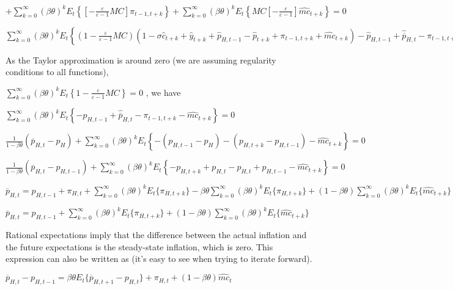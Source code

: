 \documentclass[
]{article}
\begin{document}
\(\displaystyle + \sum_{k=0}^\infty (\beta \theta)^kE_t \left\{ \left[ -\frac{\varepsilon}{\varepsilon-1} MC \right]\pi_{t-1,t+k} \right\} + \sum_{k=0}^\infty (\beta \theta)^kE_t \left\{ MC \left[ -\frac{\varepsilon}{\varepsilon-1} \right]\widehat{mc}_{t+k} \right\}=0\)

\(\displaystyle \sum_{k=0}^\infty (\beta \theta)^kE_t \left\{ \left(1-\frac{\varepsilon}{\varepsilon-1} MC \right)(1-\sigma \hat{c}_{t+k} + \hat{y}_{t+k} + \hat{p}_{H,t-1} -\hat{p}_{t+k} + \pi_{t-1,t+k} + \widehat{mc}_{t+k}) -\hat{p}_{H,t-1} +\hat{\overline{p}}_{H,t}-\pi_{t-1,t+k} - \widehat{mc}_{t+k} \right\}\)

As the Taylor approximation is around zero (we are assuming regularity
conditions to all functions),

\(\displaystyle \sum_{k=0}^\infty (\beta \theta)^kE_t \left\{ 1-\frac{\varepsilon}{\varepsilon-1} MC \right\}=0\)
, we have

\(\displaystyle \sum_{k=0}^\infty (\beta \theta)^kE_t \left\{ -\hat{p}_{H,t-1} +\hat{\overline{p}}_{H,t}-\pi_{t-1,t+k} - \widehat{mc}_{t+k} \right\}=0\)

\(\displaystyle \frac{1}{1-\beta \theta}(\overline{p}_{H,t}-p_{H}) + \sum_{k=0}^\infty (\beta \theta)^kE_t \left\{ -(p_{H,t-1}-p_{H}) -(p_{H,t+k}-p_{H,t-1}) - \widehat{mc}_{t+k} \right\}=0\)

\(\displaystyle \frac{1}{1-\beta \theta}(\overline{p}_{H,t}-p_{H,t-1}) + \sum_{k=0}^\infty (\beta \theta)^kE_t \left\{ -p_{H,t+k}+p_{H,t}-p_{H,t}+p_{H,t-1} - \widehat{mc}_{t+k} \right\}=0\)

\(\displaystyle \overline{p}_{H,t} = p_{H,t-1} + \pi_{H,t}+ \sum_{k=0}^\infty (\beta \theta)^k E_t \{\pi_{H,t+k} \} -\beta \theta\sum_{k=0}^\infty (\beta \theta)^k E_t \{\pi_{H,t+k} \} + (1-\beta \theta)\sum_{k=0}^\infty (\beta \theta)^k E_t \{\widehat{mc}_{t+k} \}\)

\(\displaystyle \overline{p}_{H,t} = p_{H,t-1} + \sum_{k=0}^\infty (\beta \theta)^k E_t \{\pi_{H,t+k} \} + (1-\beta \theta)\sum_{k=0}^\infty (\beta \theta)^k E_t \{\widehat{mc}_{t+k} \}\)

Rational expectations imply that the difference between the actual
inflation and the future expectations is the steady-state inflation,
which is zero. This expression can also be written as (it's easy to see
when trying to iterate forward).

\(\overline{p}_{H,t}-p_{H,t-1}=\beta \theta E_t \{ \overline{p}_{H,t+1}-p_{H,t}\} + \pi_{H,t}+(1-\beta \theta)\widehat{mc}_t\)
\end{document}
